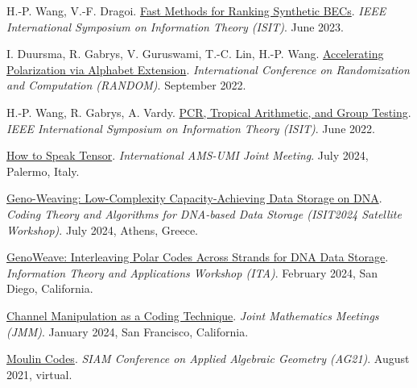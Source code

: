 \documentclass{article}
\def\sec#1{\vskip1em\textbf{\fs1#1}}
\def\fs#1{%
        \pgfmathsetmacro\a{#1}%
        \pgfmathsetmacro\A{\parskip*(4/3)^\a}%
        \pgfmathsetmacro\B{\A*(4/3)}%
        \fontsize{\A pt}{\B pt}\selectfont%
    }
\begin{document}
\begin{thebibliography}{C99}
    H.-P. Wang, V.-F. Dragoi.
    \href{https://doi.org/10.1109/ISIT54713.2023.10206704}
    {Fast Methods for Ranking Synthetic BECs}.
    \emph{IEEE International Symposium on Information Theory (ISIT)}.
    June 2023.

    I. Duursma, R. Gabrys, V. Guruswami, T.-C. Lin, H.-P. Wang.
    \href{https://doi.org/10.4230/LIPIcs.APPROX/RANDOM.2022.17}
    {Accelerating Polarization via Alphabet Extension}.
    \emph{International Conference on Randomization and Computation (RANDOM)}.
    September 2022.

    H.-P. Wang, R. Gabrys, A. Vardy.
    \href{https://doi.org/10.1109/ISIT50566.2022.9834718}
    {PCR, Tropical Arithmetic, and Group Testing}.
    \emph{IEEE International Symposium on Information Theory (ISIT)}.
    June 2022.
\end{thebibliography}
\egroup

\bgroup
\def\section#1#2{\sec{Invited Talks \mdseries (new to old)}}
\begin{thebibliography}{T9}
    \href{(https://umi.dm.unibo.it/jm-umi-ams/special-sessions/special-sessions-on-25-26-july-2024/)}
    {How to Speak Tensor}.
    \emph{International AMS-UMI Joint Meeting}.
    July 2024, Palermo, Italy.

    \href{https://www.ce.cit.tum.de/en/lnt/events/2024-coding-theory-and-algorithms-for-dna-based-data-storage/program/}
    {Geno-Weaving: Low-Complexity Capacity-Achieving Data Storage on DNA}.
    \emph{Coding Theory and Algorithms for DNA-based Data Storage (ISIT2024 Satellite Workshop)}.
    July 2024, Athens, Greece.

    \href{https://ita.ucsd.edu/workshop/schedule}
    {GenoWeave: Interleaving Polar Codes Across Strands for DNA Data Storage}.
    \emph{Information Theory and Applications Workshop (ITA)}.
    February 2024, San Diego, California.

    \href{https://meetings.ams.org/math/jmm2024/meetingapp.cgi/Paper/29146}
    {Channel Manipulation as a Coding Technique}.
    \emph{Joint Mathematics Meetings (JMM)}.
    January 2024, San Francisco, California.

    \href{https://meetings.siam.org/sess/dsp_programsess.cfm?SESSIONCODE=72368}
    {Moulin Codes}.
    \emph{SIAM Conference on Applied Algebraic Geometry (AG21)}.
    August 2021, virtual.
\end{thebibliography}
\egroup
\end{document}

